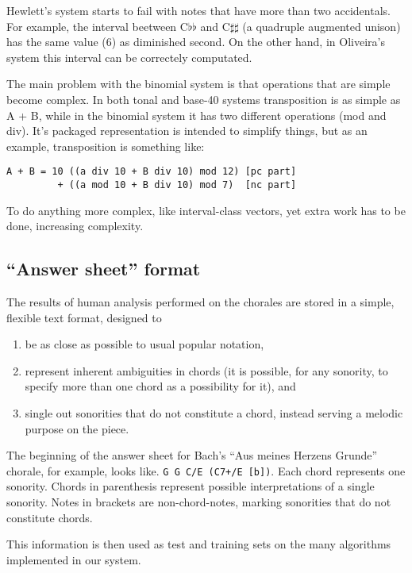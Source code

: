 \documentclass{article}
\begin{document}
Hewlett's system starts to fail with notes that have more than two
accidentals. For example, the interval beetween C$\flat\flat$ and
C$\sharp\sharp$ (a quadruple augmented unison) has the same value (6)
as diminished second. On the other hand, in Oliveira's system this
interval can be correctely computated.

The main problem with the binomial system is that operations that are
simple become complex. In both tonal and base-40 systems transposition
is as simple as A + B, while in the binomial system it has two
different operations (mod and div). It's packaged representation is
intended to simplify things, but as an example, transposition is
something like:

\begin{verbatim}
A + B = 10 ((a div 10 + B div 10) mod 12) [pc part]
         + ((a mod 10 + B div 10) mod 7)  [nc part]
\end{verbatim}

To do anything more complex, like interval-class vectors, yet extra
work has to be done, increasing complexity.

\subsection{``Answer sheet'' format}
\label{sec:formato-dos-acordes}

The results of human analysis performed on the chorales are stored in
a simple, flexible text format, designed to

\begin{enumerate}
\item be as close as possible to
usual popular notation,
\item represent inherent ambiguities in chords (it is possible, for
  any sonority, to specify more than one chord as a possibility for
  it), and
\item single out sonorities that do not constitute a chord, instead
  serving a melodic purpose on the piece.
\end{enumerate}

The beginning of the answer sheet for Bach's ``Aus meines Herzens
Grunde'' chorale, for example, looks like. \texttt{G G C/E (C7+/E
  [b])}. Each chord represents one sonority. Chords in parenthesis
represent possible interpretations of a single sonority. Notes in
brackets are non-chord-notes, marking sonorities that do not
constitute chords.

This information is then used as test and training sets on the many
algorithms implemented in our system.
\end{document}
